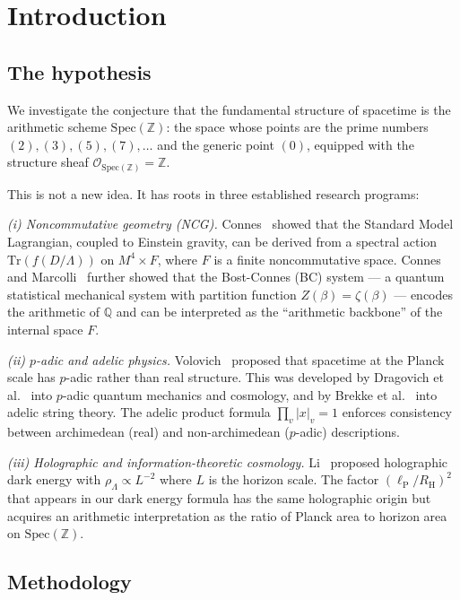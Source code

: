 \documentclass[11pt,a4paper]{article}
\newcommand{\Spec}{\mathrm{Spec}}
\newcommand{\lP}{\ell_{\mathrm{P}}}
\newcommand{\RH}{R_{\mathrm{H}}}
\begin{document}
\section{Introduction}
\label{sec:intro}

\subsection{The hypothesis}

We investigate the conjecture that the fundamental structure of
spacetime is the arithmetic scheme $\Spec(\mathbb{Z})$: the space
whose points are the prime numbers $(2), (3), (5), (7), \ldots$
and the generic point $(0)$, equipped with the structure sheaf
$\mathcal{O}_{\Spec(\mathbb{Z})} = \mathbb{Z}$.

This is not a new idea. It has roots in three established
research programs:

\textit{(i) Noncommutative geometry (NCG).}
Connes~\cite{Connes1994,Connes1996} showed that the Standard Model
Lagrangian, coupled to Einstein gravity, can be derived from a
spectral action $\mathrm{Tr}(f(D/\Lambda))$ on $M^4 \times F$,
where $F$ is a finite noncommutative space.
Connes and Marcolli~\cite{ConnesMarcolli2008} further showed that
the Bost-Connes (BC) system --- a quantum statistical mechanical
system with partition function $Z(\beta) = \zeta(\beta)$ ---
encodes the arithmetic of $\mathbb{Q}$ and can be interpreted as
the ``arithmetic backbone'' of the internal space $F$.

\textit{(ii) $p$-adic and adelic physics.}
Volovich~\cite{Volovich1987} proposed that spacetime at the Planck
scale has $p$-adic rather than real structure.
This was developed by Dragovich et al.~\cite{Dragovich2009} into
$p$-adic quantum mechanics and cosmology, and by
Brekke et al.~\cite{Brekke1993} into adelic string theory.
The adelic product formula $\prod_v |x|_v = 1$ enforces
consistency between archimedean (real) and non-archimedean
($p$-adic) descriptions.

\textit{(iii) Holographic and information-theoretic cosmology.}
Li~\cite{Li2004} proposed holographic dark energy with
$\rho_\Lambda \propto L^{-2}$ where $L$ is the horizon scale.
The factor $(\lP/\RH)^2$ that appears in our dark energy formula
has the same holographic origin but acquires an arithmetic
interpretation as the ratio of Planck area to horizon area
on $\Spec(\mathbb{Z})$.

\subsection{Methodology}
\end{document}
